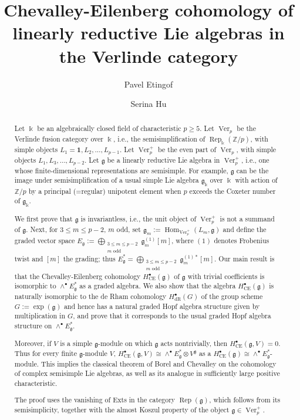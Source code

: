 \documentclass[12pt]{amsart}
\title[Lie algebra cohomology in $\Ver_p^+$]
{Chevalley-Eilenberg cohomology of linearly reductive Lie algebras in the Verlinde category}
\author{Pavel Etingof}
\author{Serina Hu}
\date{}
\theoremstyle{remark}
\DeclareMathOperator{\Ver}{Ver}
\DeclareMathOperator{\Rep}{Rep}
\DeclareMathOperator{\Hom}{Hom}
\newcommand{\kk}{\Bbbk}
\newcommand{\g}{\mathfrak g}
\newcommand{\one}{\mathbf 1}
\newcommand{\CE}{\mathrm{CE}}
\newcommand{\dR}{\mathrm{dR}}
\begin{document}
\begin{abstract}
Let $\kk$ be an algebraically closed field of characteristic $p\geq5$. Let
$\Ver_p$ be the Verlinde fusion category over $\kk$, i.e., the semisimplification of $\Rep_\kk(\mathbb Z/p)$, with simple objects 
$L_1=\one,L_2,\dots,L_{p-1}$. 
Let $\Ver_p^+$ be the even part of $\Ver_p$, with simple objects $L_1,L_3,\dots,L_{p-2}$. Let $\g$ be a linearly reductive Lie algebra in 
$\Ver_p^+$, i.e., one whose finite-dimensional representations are semisimple. For example, $\g$ can be the image under semisimplification of a usual simple Lie algebra $\g_\kk$ over $\kk$ with action of $\mathbb Z/p$ by a principal (=regular) unipotent element when $p$ exceeds the Coxeter number of $\g_\kk$. 

We first prove that $\g$ is invariantless, i.e., the unit object of $\Ver_p^+$ is not a 
summand of $\g$. Next, for
$3\leq m\leq p-2$, $m$ odd, set
$\g_m:=\Hom_{\Ver_p^+}(L_m,\g)$ and define the graded vector space
$ E_{\g}:=\bigoplus_{\substack{3\leq m\leq p-2\\m\text{ odd}}}
 \g_m^{(1)}[m]$,
where $(1)$ denotes Frobenius twist and $[m]$ the grading; 
thus $E_{\g}^*=\bigoplus_{\substack{3\leq m\leq p-2\\m\text{ odd}}}
 \g_m^{(1)*}[m]$. Our main result is that the Chevalley-Eilenberg cohomology $H^\bullet_{\CE}(\g)$ 
of $\g$ with trivial coefficients is isomorphic to $\wedge^\bullet E_{\g}^*$ as a graded algebra.
We also show that the algebra $H^\bullet_{\CE}(\g)$ is naturally isomorphic to the 
de Rham cohomology $H^\bullet_{\dR}(G)$ of the group scheme $G:=\exp(\g)$
and hence has a natural graded Hopf algebra structure given by multiplication in $G$, and prove that it corresponds to the usual graded Hopf algebra structure on $\wedge^\bullet E_{\g}^*$. 

Moreover, if $V$ is a simple $\g$-module on which $\g$ acts nontrivially, then
$H^\bullet_{\CE}(\g,V)=0$. Thus for every finite
$\g$-module $V$, 
$H^\bullet_{\CE}(\g,V)\cong\wedge^\bullet E_{\g}^*\otimes V^{\g}$ as a $H^\bullet_{\CE}(\g)\cong  
\wedge^\bullet E_{\g}^*$-module.  This implies the classical theorem of Borel and Chevalley on the cohomology of complex semisimple Lie algebras, as well as its analogue in sufficiently large positive characteristic.

The proof uses the vanishing of Exts in the category $\Rep(\g)$, which follows from its semisimplicity, together with the almost Koszul property of the 
object $\g\in \Ver_p^+$. 
\end{abstract}
\end{document}
